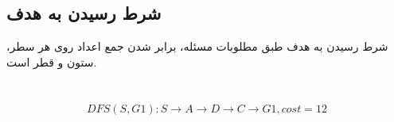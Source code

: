 \documentclass{university}
\begin{document}
\subsection{شرط رسیدن به هدف}
شرط رسیدن به هدف طبق مطلوبات مسئله، برابر شدن جمع اعداد روی هر سطر، ستون و قطر است.

\section{}
\begin{gather}
    DFS(S,G1) : S \rightarrow A \rightarrow D \rightarrow C \rightarrow G1, cost = 12
\end{gather}
\end{document}
